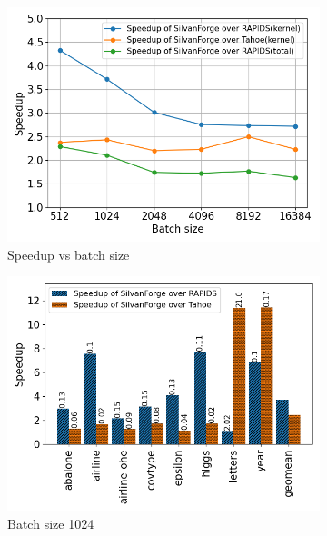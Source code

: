 \begin{figure}[htb]
    \begin{subfigure}[t]{.32\linewidth}
      \includegraphics[width=\textwidth]{figures/geomean_speedup_4060_kernel_time_total_time.png}
      \caption{\label{Fig:TBvsRAPIDSTahoe_4060_Speedup}Speedup vs batch size}      
    \end{subfigure}
    \begin{subfigure}[t]{.32\linewidth}
      \includegraphics[width=\textwidth]{figures/speedup_bar_graph_1024.png}
      \caption{\label{Fig:KernelTimeIndividualBenchmarks4060a} Batch size 1024}
    \end{subfigure}
    \begin{subfigure}[t]{.32\linewidth}

\end{subfigure}
\end{figure}
